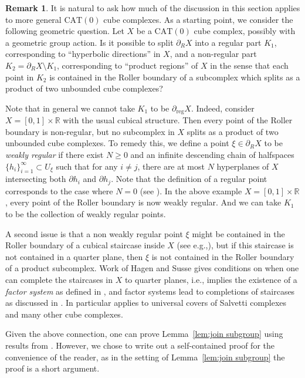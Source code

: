 \documentclass[11pt]{article}
\newcommand{\ie}{i.e.,\xspace}
\newcommand{\eg}{e.g.,\xspace}
\numberwithin{equation}{section}
\theoremstyle{plain}
\theoremstyle{definition}
\newtheorem{rk}[theo]{Remark}
\newcommand{\reg}{\mathrm{reg}}
\begin{document}
\begin{rk}
It is natural to ask how much of the discussion in this section applies to more general $\mathrm{CAT}(0)$ cube complexes. As a starting point, we consider the following geometric question.
Let $X$ be a $\mathrm{CAT}(0)$ cube complex, possibly with a geometric group action. Is it possible to split $\partial_R X$ into a regular part $K_1$, corresponding to ``hyperbolic directions'' in $X$, and a non-regular part $K_2=\partial_{R} X\setminus K_1$, corresponding to ``product regions'' of $X$ in the sense that each point in $K_2$ is contained in the Roller boundary of a subcomplex which splits as a product of two unbounded cube complexes?

Note that in general we cannot take $K_1$ to be $\partial_{\reg} X$. Indeed, consider $X=[0,1]\times \mathbb R$ with the usual cubical structure. Then every point of the Roller boundary is non-regular, but no subcomplex in $X$ splits as a product of two unbounded cube complexes. To remedy this, we define a point $\xi\in\partial_R X$ to be \emph{weakly regular} if there exist $N\ge 0$ and an infinite descending chain of halfspaces $\{h_i\}_{i=1}^\infty\subset U_\xi$ such that for any $i\neq j$, there are at most $N$ hyperplanes of $X$ intersecting both $\partial h_i$ and $\partial h_j$. Note that the definition of a regular point corresponds to the case where $N=0$ (see \cite[Prop.\,7.5]{Fer}).
In the above example $X=[0,1]\times\mathbb{R}$, every point of the Roller boundary is now weakly regular. And we can take $K_1$ to be the collection of weakly regular points.

A second issue is that a non weakly regular point $\xi$ might be contained in the Roller boundary of a cubical staircase inside $X$ (see \eg \cite[Fig.\,1]{hagen2020hierarchical}), but if this
staircase is not contained in a quarter plane, then $\xi$ is not contained in the Roller boundary of a product subcomplex. Work of Hagen and Susse \cite{hagen2020hierarchical} gives conditions on when one can complete the staircases in $X$ to quarter planes, \ie \cite[Th.\,A]{hagen2020hierarchical} implies the existence of a \emph{factor system} as defined in \cite[\S 1.2]{hagen2020hierarchical}, and factor systems lead to completions of staircases as discussed in \cite[\S 7]{hagen2020hierarchical}. In particular \cite[Th.\,A]{hagen2020hierarchical} applies to universal covers of Salvetti complexes and many other cube complexes.

Given the above connection, one can prove Lemma~\ref{lem:join subgroup} using results from \cite{hagen2020hierarchical}. However, we chose to write out a self-contained proof for the convenience of the reader, as in the setting of Lemma~\ref{lem:join subgroup} the proof is a short argument.
\end{rk}
\end{document}
